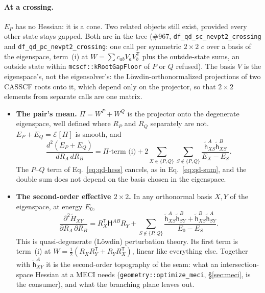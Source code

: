 \documentclass[11pt]{article}
\newcommand{\code}[1]{\texttt{#1}}
\newcommand{\T}{\mathsf T}
\begin{document}
\paragraph{At a crossing.} $E_P$ has no Hessian: it is a cone. Two
related objects still exist, provided every other state stays gapped. Both
are in the tree (\#967, \code{df\_qd\_sc\_nevpt2\_crossing} and
\code{df\_qd\_pc\_nevpt2\_crossing}: one call per symmetric $2\times2$
$c$ over a basis of the eigenspace, term~(i) at $W = \sum c_{ab}V_aV_b^\T$
plus the outside-state sums, an outside state within
\code{mcscf::kRootGapFloor} of $P$ or $Q$ refused). The basis $V$ is the
eigenspace's, not the eigensolver's: the L\"owdin-orthonormalized
projections of two CASSCF roots onto it, which depend only on the
projector, so that $2\times2$ elements from separate calls are one
matrix.
\begin{itemize}
\item \textbf{The pair's mean.} $\Pi = W^P + W^Q$ is the projector onto
  the degenerate eigenspace, well defined where $R_P$ and $R_Q$
  separately are not. $E_P + E_Q = \mathcal E[\Pi]$ is smooth, and
  \begin{equation}
    \frac{d^2(E_P + E_Q)}{dR_A\,dR_B} = \Pi\text{-term (i)}
      + 2\sum_{X\in\{P,Q\}}\sum_{S\notin\{P,Q\}}\frac{\tilde{\mathsf h}^A_{XS}\tilde{\mathsf h}^B_{XS}}{E_X - E_S}.
    \label{eq:qd-pair}
  \end{equation}
  The $P$--$Q$ term of Eq.~\eqref{eq:qd-hess} cancels, as in
  Eq.~\eqref{eq:qd-sum}, and the double sum does not depend on the basis
  chosen in the eigenspace.
\item \textbf{The second-order effective $2\times2$.} In any orthonormal
  basis $X, Y$ of the eigenspace, at energy $E_0$,
  \begin{equation}
    \frac{\partial^2\tilde H_{XY}}{\partial R_A\,\partial R_B}
    = R_X^\T\mathsf H^{AB}R_Y
      + \sum_{S\notin\{P,Q\}}\frac{\tilde{\mathsf h}^A_{XS}\tilde{\mathsf h}^B_{SY}
      + \tilde{\mathsf h}^B_{XS}\tilde{\mathsf h}^A_{SY}}{E_0 - E_S}.
    \label{eq:qd-lowdin}
  \end{equation}
  This is quasi-degenerate (L\"owdin) perturbation theory. Its first term
  is term~(i) at $W = \tfrac12(R_XR_Y^\T + R_YR_X^\T)$, linear like
  everything else. Together with $\tilde{\mathsf h}^A_{XY}$ it is the
  second-order topography of the seam: what an intersection-space Hessian
  at a MECI needs (\code{geometry::optimize\_meci}, \S\ref{sec:meci}, is
  the consumer), and what the branching plane leaves out.
\end{itemize}
\end{document}
